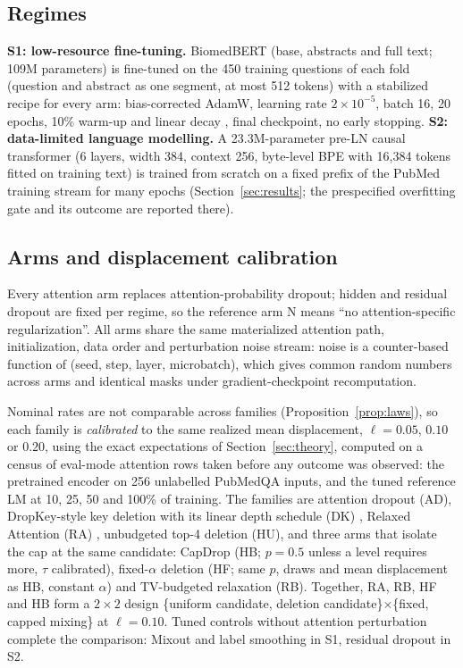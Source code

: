 \subsection{Regimes}
\textbf{S1: low-resource fine-tuning.} BiomedBERT (base, abstracts and full text; 109M parameters)
\citep{gu2021domain} is fine-tuned on the 450 training questions of each fold (question and abstract as
one segment, at most 512 tokens) with a stabilized recipe for every arm: bias-corrected AdamW,
learning rate $2\times10^{-5}$, batch 16, 20 epochs, 10\% warm-up and linear decay
\citep{mosbach2021stability}, final checkpoint, no early stopping.
\textbf{S2: data-limited language modelling.} A 23.3M-parameter pre-LN causal transformer (6 layers,
width 384, context 256, byte-level BPE with 16{,}384 tokens fitted on training text) is trained from
scratch on a fixed prefix of the PubMed training stream for many epochs (Section~\ref{sec:results};
the prespecified overfitting gate and its outcome are reported there).

\subsection{Arms and displacement calibration}
Every attention arm replaces attention-probability dropout; hidden and residual dropout are fixed per
regime, so the reference arm N means ``no attention-specific regularization''. All arms share the same
materialized attention path, initialization, data order and perturbation noise stream: noise is a
counter-based function of (seed, step, layer, microbatch), which gives common random numbers across arms
and identical masks under gradient-checkpoint recomputation.

Nominal rates are not comparable across families (Proposition~\ref{prop:laws}), so each family is
\emph{calibrated} to the same realized mean displacement, $\ell=0.05$, $0.10$ or $0.20$, using the exact
expectations of Section~\ref{sec:theory}, computed on a census of eval-mode attention rows taken before
any outcome was observed: the pretrained encoder on 256 unlabelled PubMedQA inputs, and the tuned
reference LM at 10, 25, 50 and 100\% of training. The families are attention dropout (AD), DropKey-style
key deletion with its linear depth schedule (DK) \citep{li2023dropkey}, Relaxed Attention (RA)
\citep{lohrenz2023relaxed}, unbudgeted top-4 deletion (HU), and three arms that isolate the cap at the
same candidate: CapDrop (HB; $p=0.5$ unless a level requires more, $\tau$ calibrated), fixed-$\alpha$
deletion (HF; same $p$, draws and mean displacement as HB, constant $\alpha$) and TV-budgeted
relaxation (RB). Together, RA, RB, HF and HB form a $2\times2$ design
\{uniform candidate, deletion candidate\}$\times$\{fixed, capped mixing\} at $\ell=0.10$.
Tuned controls without attention perturbation complete the comparison: Mixout
\citep{lee2020mixout} and label smoothing in S1, residual dropout in S2.

